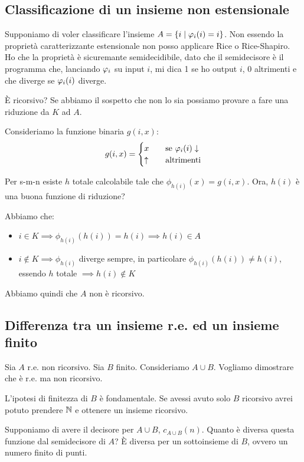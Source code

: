 \subsection{Classificazione di un insieme non estensionale}

Supponiamo di voler classificare l'insieme $A = \{i \mid \varphi_{i}(i) = i\}$. Non essendo la proprietà
caratterizzante estensionale non posso applicare Rice o Rice-Shapiro. Ho che la proprietà è
sicuremante semidecidibile, dato che il semidecisore è il programma che, lanciando $\varphi_{i}$ su input
$i$, mi dica 1 se ho output $i$, 0 altrimenti e che diverge se $\varphi_{i}(i)$ diverge.

È ricorsivo? Se abbiamo il sospetto che non lo sia possiamo provare a fare una riduzione da $K$ ad
$A$.

Consideriamo la funzione binaria $g(i,x)$:
\begin{equation*}
    g(i,x) =
    \begin{cases}
        x \quad &\text{se $\varphi_{i}(i) \downarrow$} \\
        \uparrow \quad &\text{altrimenti}
    \end{cases}
\end{equation*}

Per s-m-n esiste $h$ totale calcolabile tale che $\phi_{h(i)}(x) = g(i,x)$. Ora, $h(i)$ è una buona funzione di
riduzione?

Abbiamo che:
\begin{itemize}
    \item $i \in K \implies \phi_{h(i)}(h(i)) = h(i) \implies h(i) \in A$
    \item $i \notin K \implies \phi_{h(i)}$ diverge sempre, in particolare $\phi_{h(i)}(h(i)) \not=
    h(i)$, essendo $h$ totale $ \implies h(i) \notin K$
\end{itemize}

Abbiamo quindi che $A$ non è ricorsivo.

\subsection{Differenza tra un insieme r.e. ed un insieme finito}

Sia $A$ r.e. non ricorsivo. Sia $B$ finito. Consideriamo $A \cup B$. Vogliamo dimostrare che è r.e.
ma non ricorsivo.

L'ipotesi di finitezza di $B$ è fondamentale. Se avessi avuto solo $B$ ricorsivo avrei potuto prendere
$\mathbb{N}$ e ottenere un insieme ricorsivo.

Supponiamo di avere il decisore per $A \cup B$, $c_{A \cup B}(n)$. Quanto è diversa questa funzione dal
semidecisore di $A$? È diversa per un sottoinsieme di $B$, ovvero un numero finito di punti.

